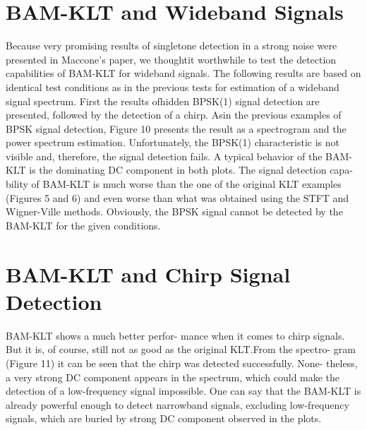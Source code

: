 \documentclass[12pt]{report}
\begin{document}
\section*{BAM-KLT and Wideband Signals}
Because very promising results of singletone detection in a strong noise were presented in Maccone's paper, we thoughtit worthwhile to test the detection capabilities of BAM-KLT for wideband signals. The following results are based on identical test conditions as in the previous tests for estimation of a wideband signal spectrum. First the results ofhidden BPSK(1) signal detection are presented, followed by the detection of a chirp.
Asin the previous examples of BPSK signal detection, Figure 10 presents the result as a spectrogram and the power spectrum estimation. Unfortunately, the BPSK(1) characteristic is not visible and, therefore, the signal detection fails.
A typical behavior of the BAM-KLT is the dominating DC component in both plots. The signal detection capa-
bility of BAM-KLT is much worse than
the one of the original KLT examples
(Figures 5 and 6) and even worse than
what was obtained using the STFT and
Wigner-Ville methods. Obviously, the
BPSK signal cannot be detected by the
BAM-KLT for the given conditions.
\section*{BAM-KLT and Chirp Signal Detection}
BAM-KLT shows a much better perfor-
mance when it comes to chirp signals.
But it is, of course, still not as good as
the original KLT.\@ From the spectro-
gram (Figure 11) it can be seen that the
chirp was detected successfully. None-
theless, a very strong DC component
appears in the spectrum, which could
make the detection of a low-frequency
signal impossible. One can say that the
BAM-KLT is already powerful enough
to detect narrowband signals, excluding
low-frequency signals, which are buried
by strong DC component observed in
the plots.
\end{document}
